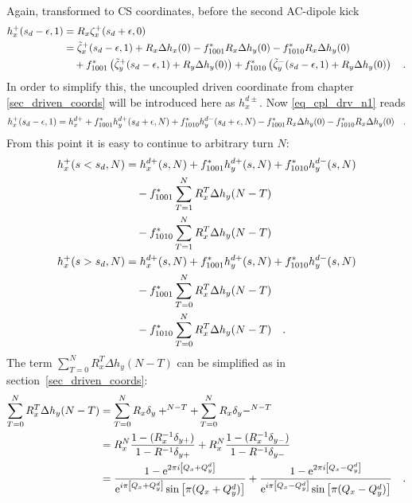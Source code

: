 %
Again, transformed to CS coordinates, before the second AC-dipole kick
%
\begin{align}
    h_x^+(s_d-\epsilon, 1) &=R_x\zeta_x^+(s_d+\epsilon, 0) \notag \\
        &=
        \tilde{\zeta}_x^+(s_d-\epsilon, 1) + R_x\Delta h_x(0)
            - f_{1001}^* R_x\Delta h_y(0)
            - f_{1010}^* R_x\Delta h_y(0)
        \notag \\ &\quad 
            + f_{1001}^* \left(\tilde{\zeta}_y^+(s_d-\epsilon, 1) + R_y\Delta h_y(0) \right)
            + f_{1010}^* \left(\tilde{\zeta}_y^-(s_d-\epsilon, 1) + R_y\Delta h_y(0) \right)
    \quad .
    \label{eq_cpl_drv_n1}
\end{align}
%
In order to simplify this, the uncoupled driven coordinate from chapter \ref{sec_driven_coords} will
be introduced here as $h_x^{d\pm}$.
Now \eqref{eq_cpl_drv_n1} reads
%
\begin{equation}
    h_x^+(s_d-\epsilon, 1)
        = h_x^{d+} + f_{1001}^* h_y^{d+}(s_d+\epsilon, N) + f_{1010}^* h_y^{d-}(s_d+\epsilon, N) 
            - f_{1001}^* R_x\Delta h_y(0)
            - f_{1010}^* R_x\Delta h_y(0)
    \quad .
\end{equation}
%
From this point it is easy to continue to arbitrary turn $N$:
%
\begin{align}
    h_x^+(s<s_d, N) &= h_x^{d+}(s,N)
        + f_{1001}^* h_y^{d+} (s, N)
        + f_{1010}^* h_y^{d-} (s, N) \notag \\
        & \quad - f_{1001}^* \sum\limits_{T = 1}^N R_x^{T}\Delta h_y(N-T) \notag \\
        & \quad - f_{1010}^* \sum\limits_{T = 1}^N R_x^{T}\Delta h_y(N-T)
        \notag \\
    h_x^+(s>s_d, N) &= h_x^{d+}(s,N)
        + f_{1001}^* h_y^{d+} (s, N)
        + f_{1010}^* h_y^{d-} (s, N) \notag \\
        & \quad - f_{1001}^* \sum\limits_{T = 0}^N R_x^{T}\Delta h_y(N-T) \notag \\
        & \quad - f_{1010}^* \sum\limits_{T = 0}^N R_x^{T}\Delta h_y(N-T)
        \quad .
\end{align}
%
The term $\sum\limits_{T = 0}^N R_x^{T}\Delta h_y(N-T) $ can be simplified as in section~\ref{sec_driven_coords}:
%
\begin{align}
    \sum\limits_{T=0}^N R_x^T \Delta h_y(N-T)
        &=
        \sum\limits_{T=0}^N R_x \delta_y+^{N-T}
        +\sum\limits_{T=0}^N R_x \delta_y-^{N-T} \notag \\
        &=
        R_x^N\frac{1-(R_x^{-1}\delta_{y+})}{1-R^{-1}\delta_{y+}}
        +R_x^N\frac{1-(R_x^{-1}\delta_{y-})}{1-R^{-1}\delta_{y-}}
        \notag \\
        &=\frac{1-\text{e}^{2\pi i \left[ Q_x + Q_y^d \right]}}{\text{e}^{i\pi \left[Q_x+Q_y^d\right]}\sin\left[\pi (Q_x+Q_y^d)\right]}
        +\frac{1-\text{e}^{2\pi i \left[ Q_x - Q_y^d \right]}}{\text{e}^{i\pi \left[Q_x-Q_y^d\right] }\sin\left[\pi (Q_x-Q_y^d)\right]}
        \quad .
\end{align}
